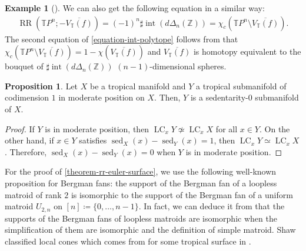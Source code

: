 \documentclass[a4paper,dvipdfmx,reqno,12pt]{amsart}
\theoremstyle{definition}
\newtheorem{example}[theorem]{Example}
\newtheorem{proposition}[theorem]{Proposition}
\newcommand{\deq}{\coloneqq}
\newcommand{\opn}[1]{\operatorname{#1}}
\numberwithin{equation}{section}
\begin{document}
\begin{example}[{\cite[Example 2.11]{demedrano2023chern}}]
We can also get the following equation in a similar way:
\begin{align}
\label{equation-int-polytope}
\opn{RR}(\mathbb{T}P^{n};-\overline{V_{\mathbb{T}}(f)})=
(-1)^{n}\sharp \opn{int}(d\Delta_n(\mathbb{Z}))=
\chi_{c}(\mathbb{T}P^{n}\setminus
\overline{V_{\mathbb{T}}(f)}).
\end{align}
The second equation of \eqref{equation-int-polytope}
follows from that 
$\chi_{c}(\mathbb{T}P^{n}\setminus
\overline{V_{\mathbb{T}}(f)})
=1-\chi (\overline{V_{\mathbb{T}}(f)})$
and $\overline{V_{\mathbb{T}}(f)}$ is homotopy 
equivalent to the bouquet
of $\sharp \opn{int}(d\Delta_n(\mathbb{Z}))$
$(n-1)$-dimensional spheres.
\end{example}

\begin{proposition}
Let $X$ be a tropical manifold and 
$Y$ a tropical submanifold of codimension $1$
in moderate position on $X$.
Then, $Y$ is a sedentarity-0 submanifold of $X$.
\end{proposition}
\begin{proof}
If $Y$ is in moderate position,
then $\opn{LC}_x Y\not \simeq \opn{LC}_x X$ for all 
$x \in Y$.
On the other hand, if $x \in Y$ satisfies 
$\opn{sed}_X(x)-\opn{sed}_Y(x)=1$, then
$\opn{LC}_x Y\simeq \opn{LC}_x X$.
Therefore, $\opn{sed}_X(x)-\opn{sed}_Y(x)=0$ when
$Y$ is in moderate position. 
\end{proof}
For the proof of \cref{theorem-rr-euler-surface}, we 
use the following well-known 
proposition for Bergman fans: 
the support of the Bergman fan of
a loopless matroid of rank $2$ 
is isomorphic to the support of the Bergman fan of
a uniform matroid $U_{2,n}$ on
$[n]\deq \{0,\ldots,n-1\}$.
In fact, we can deduce it from that 
the supports of the Bergman fans of
loopless matroids are isomorphic
when the simplification of them are isomorphic
and the definition of simple matroid.
Shaw classified local cones which comes from
for some tropical surface in
\cite[Corollary 2.4]{shaw2015tropical}.
\end{document}
